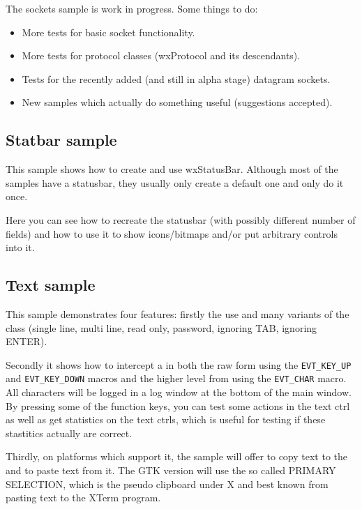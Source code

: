 The sockets sample is work in progress. Some things to do:

\begin{itemize}\itemsep=0pt
\item More tests for basic socket functionality.
\item More tests for protocol classes (wxProtocol and its descendants).
\item Tests for the recently added (and still in alpha stage) datagram sockets.
\item New samples which actually do something useful (suggestions accepted).
\end{itemize}

\subsection{Statbar sample}\label{samplestatbar}

This sample shows how to create and use wxStatusBar. Although most of the
samples have a statusbar, they usually only create a default one and only
do it once.

Here you can see how to recreate the statusbar (with possibly different number
of fields) and how to use it to show icons/bitmaps and/or put arbitrary
controls into it.

\subsection{Text sample}\label{sampletext}

This sample demonstrates four features: firstly the use and many variants of
the  class (single line, multi line, read only,
password, ignoring TAB, ignoring ENTER).

Secondly it shows how to intercept a  in both
the raw form using the {\tt EVT\_KEY\_UP} and {\tt EVT\_KEY\_DOWN} macros and the
higher level from using the {\tt EVT\_CHAR} macro. All characters will be logged
in a log window at the bottom of the main window. By pressing some of the function
keys, you can test some actions in the text ctrl as well as get statistics on the
text ctrls, which is useful for testing if these stastitics actually are correct.

Thirdly, on platforms which support it, the sample will offer to copy text to the 
 and to paste text from it. The GTK version will
use the so called PRIMARY SELECTION, which is the pseudo clipboard under X and
best known from pasting text to the XTerm program.

